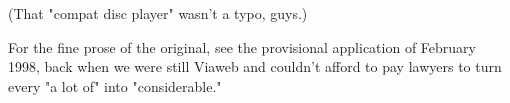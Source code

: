                   (That "compat disc player" wasn't a typo, guys.)

For
                  the fine prose of the original, see the provisional
                  application of February 1998, back when we were still Viaweb
                  and couldn't afford to pay lawyers to turn every "a lot of"
                  into "considerable."


              
            
          
            
              
                


                  
              
            
          
